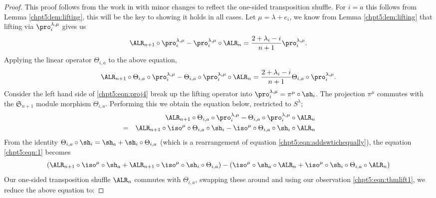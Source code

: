 \documentclass[11pt]{report}
\begin{document}
\begin{proof}
	This proof follows from the work in \cite{dieker2018spectral} with 
	minor changes to reflect the one-sided transposition shuffle. For $i=a$ this follows from Lemma \ref{chpt5:lem:lifting}, this will be the key	to showing 	it 	holds in all cases.
	Let $\mu = \lambda + e_{i}$, we know from Lemma \ref{chpt5:lem:lifting} that lifting via $\pro_{i}^{\lambda,\mu}$ gives us
	\begin{eqnarray}
	\ALR_{n+1} \circ \pro_{i}^{\lambda,\mu} - 
	\pro_{i}^{\lambda,\mu} \circ \ALR_{n} = \frac{2+\lambda_{i} 
		-i}{n+1}\pro_{i}^{\lambda,\mu}  \label{chpt5:eqn:thmlift1}.
	\end{eqnarray}
	Applying the linear operator $\Theta_{i,a}$ to the above equation,
	\begin{eqnarray}
	\ALR_{n+1} \circ \Theta_{i,a} \circ 
	\pro_{i}^{\lambda,\mu} 
	- \Theta_{i,a} \circ \pro_{i}^{\lambda,\mu} \circ \ALR_{n} 
	= 
	\frac{2 + \lambda_{i}-i}{n+1}\Theta_{i,a} \circ 
	\pro_{i}^{\lambda,\mu}  \label{chpt5:eqn:proj4}.
	\end{eqnarray}
	Consider the left hand side of \eqref{chpt5:eqn:proj4} break up the lifting operator into 
	$\pro_{i}^{\lambda,\mu} = \pi^{\mu} \circ \sh_{i}$. The projection $\pi^{\mu}$ commutes with the $\mathfrak{S}_{n+1}$ module morphism $\Theta_{i,a}$. Performing this we obtain the equation below, restricted to $S^{\lambda}$;
	\begin{eqnarray}
	& & \ALR_{n+1} \circ \Theta_{i,a} \circ \pro_{i}^{\lambda,\mu}		
	- \Theta_{i,a} \circ \pro_{i}^{\lambda,\mu} \circ 		
	\ALR_{n} \nonumber\\
	& = & 	
	\ALR_{n+1}  \circ \iso^{\mu} \circ \Theta_{i,a} \circ 
	\sh_{i} -  \iso^{\mu} \circ \Theta_{i,a}  \circ \sh_{i} 
	\circ \ALR_{n} \label{chpt5:eqn:1}
	\end{eqnarray}
	From the identity $\Theta_{i,a} \circ \sh_{i} = \sh_{a} + \sh_{i} 
	\circ 
	\Theta_{i,a}$ (which is a rearrangement of equation \eqref{chpt5:eqn:addswtichequally}), the equation \eqref{chpt5:eqn:1} becomes 		
	\begin{eqnarray*}
		(\ALR_{n+1}  \circ \iso^{\mu} \circ  \sh_{a}  + 
		\ALR_{n+1}  \circ \iso^{\mu} \circ  \sh_{i} \circ 
		\Theta_{i,a})
		-(\iso^{\mu} \circ \sh_{a} \circ \ALR_{n} + 
		\iso^{\mu} \circ \sh_{i} \circ \Theta_{i,a}  \circ 
		\ALR_{n}) 
	\end{eqnarray*}
	Our one-sided transposition shuffle $\ALR_{n}$ commutes with $\Theta_{i,a}$, swapping these around and using our observation \eqref{chpt5:eqn:thmlift1}, we reduce the above equation to:

\end{proof}
\end{document}
